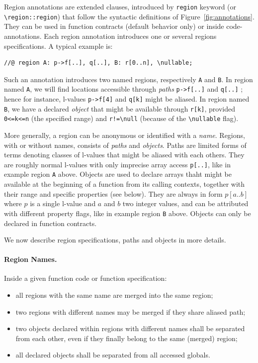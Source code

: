 Region annotations are extended \acsl clauses, introduced by
\verb+region+ keyword (or \verb+\region::region+) that follow the syntactic
definitions of Figure~\ref{fig:annotations}. They can be used in function
contracts (default behavior only) or inside code-annotations.
Each region annotation introduces one or several regions specifications.
A typical example is:

\begin{lstlisting}
//@ region A: p->f[..], q[..], B: r[0..n], \nullable;
\end{lstlisting}

Such an annotation introduces two named regions, respectively \verb+A+ and
\verb+B+. In region named \verb+A+, we will find locations accessible through
\emph{paths} \verb+p->f[..]+ and \verb+q[..]+ ; hence for instance, l-values
\verb+p->f[4]+ and \verb+q[k]+ might be aliased. In region named \verb+B+, we
have a declared \emph{object} that might be available through \verb$r[k]$,
provided \verb$0<=k<=n$ (the specified range) and \verb$r!=\null$ (because of
the \verb+\nullable+ flag).

More generally, a region can be anonymous or identified with a \emph{name}.
Regions, with or without names, consists of \emph{paths} and \emph{objects}.
Paths are limited forms of \acsl terms denoting classes of l-values that might
be aliased with each others. They are roughly normal l-values with only
imprecise array access \verb$p[..]$, like in example region \verb+A+ above.
Objects are used to declare arrays thaht might be available at the beginning of
a function from its calling contexts, together with their range and specific
properties (see below). They are always in form $p[a..b]$ where $p$ is a single
l-value and $a$ and $b$ two integer values, and can be attributed with different
property flags, like in example region \verb+B+ above. Objects can only be
declared in function contracts.

We now describe region specifications, paths and objects in more details.

\paragraph{Region Names.} Inside a given function code or function
specification:
\begin{itemize}
  \item all regions with the same name are merged into the same region;
  \item two regions with different names may be merged if they share aliased path;
  \item two objects declared within regions with different names shall be
  separated from each other, even if they finally belong to the same (merged)
  region;
  \item all declared objects shall be separated from all accessed globals.
\end{itemize}

